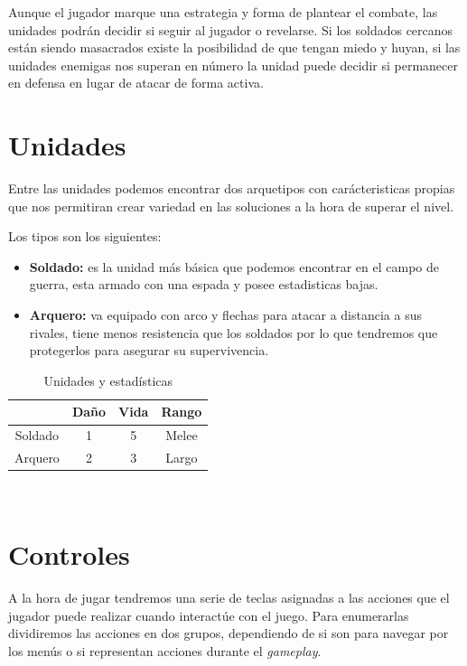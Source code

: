 Aunque el jugador marque una estrategia y forma de plantear el combate, las unidades podrán
decidir si seguir al jugador o revelarse. Si los soldados cercanos están siendo masacrados
existe la posibilidad de que tengan miedo y huyan, si las unidades enemigas nos superan en número
la unidad puede decidir si permanecer en defensa en lugar de atacar de forma activa.

\section{Unidades}
Entre las unidades podemos encontrar dos arquetipos con carácteristicas propias
que nos permitiran crear variedad en las soluciones a la hora de superar el
nivel.

Los tipos son los siguientes:
\begin{itemize}
	\item \textbf{Soldado:} es la unidad más básica que podemos encontrar en el campo de
							guerra, esta armado con una espada y posee estadisticas
							bajas.
	\item \textbf{Arquero:} va equipado con arco y flechas para atacar a distancia a
							sus rivales, tiene menos resistencia que los soldados por
							lo que tendremos que protegerlos para asegurar su
							supervivencia.
\end{itemize}

\begin{table}[ht]
\begin{center}
\begin{tabular}{|c|c|c|c|}
\hline
        & Daño & Vida & Rango \\ 
\hline
\hline
Soldado & 1    & 5    & Melee \\ 
\hline
Arquero & 2    & 3    & Largo \\ 
\hline
\end{tabular}\\
\caption{Unidades y estadísticas}
\end{center}
\end{table}

\section{Controles}
A la hora de jugar tendremos una serie de teclas asignadas a las acciones que el
jugador puede realizar cuando interactúe con el juego. Para enumerarlas dividiremos las
acciones en dos grupos, dependiendo de si son para navegar por los menús o si
representan acciones durante el \textit{gameplay}.

